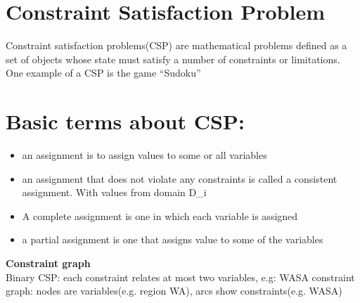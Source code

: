 \section{Constraint Satisfaction Problem }
Constraint satisfaction problems(CSP) are mathematical problems defined as a set of objects whose state must satisfy a number of constraints or limitations. One example of a CSP is the game “Sudoku” \\[3ex]

\section{Basic terms about CSP:}
\begin{itemize}
\item an assignment is to assign values to some or all variables
\item an assignment that does not violate any constraints is called a consistent assignment. With values from domain D\_i
\item A complete assignment is one in which each variable is assigned
\item a partial assignment is one that assigns value to some of the variables 
\end{itemize}


\textbf{Constraint graph}\\
Binary CSP: each constraint relates at most two variables, e.g: WASA
constraint graph: nodes are variables(e.g. region WA), arcs show constraints(e.g. WASA)\\[3ex]

